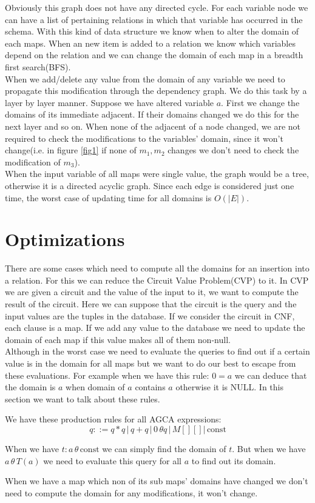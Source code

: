 \documentclass[12pt]{article}
\begin{document}
Obviously this graph does not have any directed cycle. For each variable node we can have a list of pertaining relations in which that variable has occurred in the schema. With this kind of data structure we know when to alter the domain of each maps. When an new item is added to a relation we know which variables depend on the relation and we can change the domain of each map in a breadth first search(BFS).  \\

When we add/delete any value from the domain of any variable we need to propagate this modification through the dependency graph. We do this task by a layer by layer manner. Suppose we have altered variable $a$. First we change the domains of its immediate adjacent. If their domains changed we do this for the next layer and so on. When none of the adjacent of a node changed, we are not required to check the modifications to the variables' domain, since it won't change(i.e. in figure \ref{fig1} if none of $m_{1},m_{2}$ changes we don't need to check the modification of $m_{3}$).\\

When the input variable of all maps were single value, the graph would be a tree, otherwise it is a directed acyclic graph. Since each edge is considered just one time, the worst case of updating time for all domains is $O(|E|)$. 

\section{Optimizations}
There are some cases which need to compute all the domains for an insertion into a relation. For this we can reduce the Circuit Value Problem(CVP) to it. In CVP we are given a circuit and the value of the input to it, we want to compute the result of the circuit. Here we can suppose that the circuit is the query and the input values are the tuples in the database. If we consider the circuit in CNF, each clause is a map. If we add any value to the database we need to update the domain of each map if this value makes all of them non-null. \\

Although in the worst case we need to evaluate the queries to find out if a certain value is in the domain for all maps but we want to do our best to escape from these evaluations. For example when we have this rule: $0=a$ we can deduce that the domain is $a$ when domain of $a$ contains $a$ otherwise it is NULL. In this section we want to talk about these rules.

We have these production rules for all AGCA expressions:
\begin{equation*}
q::= q*q\,|\,q+q\,|\,0\,\theta q\,|\,M[][]|\,\text{const}
\end{equation*}
 
When we have $t:a\,\theta\,\text{const}$ we can simply find the domain of $t$. But when we have $a\,\theta\,T(a)$ we need to evaluate this query for all $a$ to find out its domain. 

When we have a map which non of its sub maps' domains have changed we don't need to compute the domain for any modifications, it won't change. 
\end{document}
